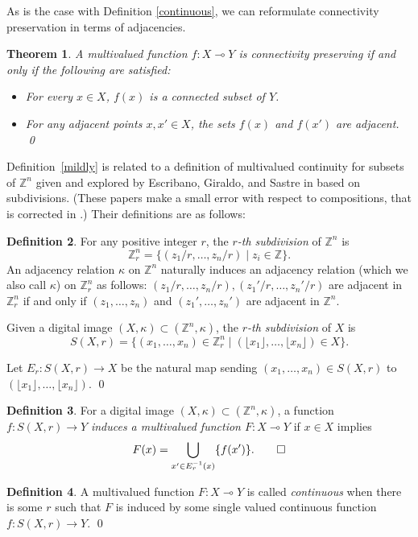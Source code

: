 \documentclass{article}
\theoremstyle{plain}
\newtheorem{thm}{Theorem}
\theoremstyle{definition}
\newtheorem{definition}[thm]{Definition}
\numberwithin{thm}{section}
\def\Z{{\mathbb Z}}
\begin{document}
As is the case with Definition \ref{continuous}, we can reformulate connectivity preservation in terms of adjacencies.

\begin{thm}
\rm{\cite{BoxSta16}}
\label{mildadj}
A multivalued function $f:X \multimap Y$ is connectivity preserving if and only if the following are satisfied:
\begin{itemize}
\item For every $x \in X$, $f(x)$ is a connected subset of $Y$.
\item For any adjacent points $x,x'\in X$, the sets $f(x)$ and $f(x')$ are adjacent. \qed
\end{itemize}
\end{thm}

Definition~\ref{mildly} is related to a definition of multivalued continuity for subsets of $\Z^n$ given and explored by Escribano, Giraldo, and Sastre in \cite{egs08, egs12} based on subdivisions. (These papers make a small error with respect to compositions, that is corrected in \cite{gs15}.) Their definitions are as follows:
\begin{definition}
For any positive integer $r$, the \emph{$r$-th subdivision} of $\Z^n$ is
\[ \Z_r^n = \{ (z_1/r, \dots, z_n/r) \mid z_i \in \Z \}. \]
An adjacency relation $\kappa$ on $\Z^n$ naturally induces an adjacency relation (which we also call $\kappa$) on $\Z_r^n$ as follows: $(z_1/r, \dots, z_n/r), (z_1'/r, \dots, z_n'/r)$ are adjacent in $\Z^n_r$ if and only if $(z_1, \dots, z_n)$ and $(z_1', \dots, z_n')$ are adjacent in $\Z^n$.

Given a digital image $(X,\kappa) \subset (\Z^n,\kappa)$, the \emph{$r$-th subdivision} of $X$ is 
\[ S(X,r) = \{ (x_1,\dots, x_n) \in \Z^n_r \mid (\lfloor x_1 \rfloor, \dots, \lfloor x_n \rfloor) \in X \}. \]

Let $E_r:S(X,r) \to X$ be the natural map sending $(x_1,\dots,x_n) \in S(X,r)$ to $(\lfloor x_1 \rfloor, \dots, \lfloor x_n \rfloor)$. \qed
\end{definition}

\begin{definition}
For a digital image $(X,\kappa) \subset (\Z^n,\kappa)$, a function $f:S(X,r) \to Y$ \emph{induces a multivalued function $F:X\multimap Y$} if $x \in X$ implies
\[ F(x) = \bigcup_{x' \in E^{-1}_r(x)} \{f(x')\}. \qed \]
\end{definition}

\begin{definition}
\label{multi-cont}
A multivalued function $F:X\multimap Y$ is called \emph{continuous} when there is some $r$ such that $F$ is induced by some single valued continuous function $f:S(X,r) \to Y$. 
\qed
\end{definition}
\end{document}
